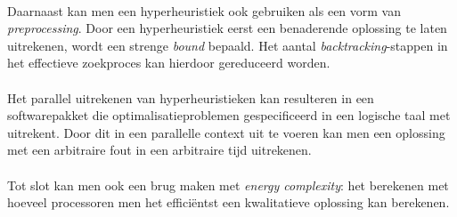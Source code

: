 \paragraph{}
Daarnaast kan men een hyperheuristiek ook gebruiken als een vorm van \emph{preprocessing}. Door een hyperheuristiek eerst een benaderende oplossing te laten uitrekenen, wordt een strenge \emph{bound} bepaald. Het aantal \emph{backtracking}-stappen in het effectieve zoekproces kan hierdoor gereduceerd worden.

\paragraph{}
Het parallel uitrekenen van hyperheuristieken kan resulteren in een softwarepakket die optimalisatieproblemen gespecificeerd in een logische taal met uitrekent. Door dit in een parallelle context uit te voeren kan men een oplossing met een arbitraire fout in een arbitraire tijd uitrekenen.

\paragraph{}
Tot slot kan men ook een brug maken met \emph{energy complexity}\cite{Roy:2013:ECM:2422436.2422470,conf/icpp/KorthikantiAG11}: het berekenen met hoeveel processoren men het effici\"entst een kwalitatieve oplossing kan berekenen.

